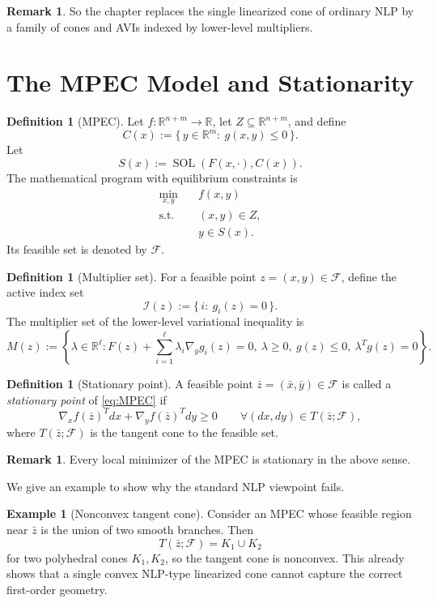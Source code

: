 \documentclass[pdflatex,sn-mathphys-num]{sn-jnl}%
\theoremstyle{definition}
\newtheorem{definition}[theorem]{Definition}
\newtheorem{remark}[theorem]{Remark}
\newtheorem{example}[theorem]{Example}
\newcommand{\R}{\mathbb{R}}
\newcommand{\Fcal}{\mathcal{F}}
\newcommand{\Ical}{\mathcal{I}}
\newcommand{\SOL}{\operatorname{SOL}}
\begin{document}
\begin{remark}
So the chapter replaces the single linearized cone of ordinary NLP by a
family of cones and AVIs indexed by lower-level multipliers.
\end{remark}

\section{The MPEC Model and Stationarity}

\begin{definition}[MPEC]
Let $f:\R^{n+m}\to\R$, let $Z\subseteq \R^{n+m}$, and define
\[
C(x):=\{\,y\in\R^m:\ g(x,y)\le 0\,\}.
\]
Let
\[
S(x):=\SOL(F(x,\cdot),C(x)).
\]
The mathematical program with equilibrium constraints is
\begin{equation}
\label{eq:MPEC}
\begin{aligned}
\min_{x,y}\quad & f(x,y)\\
\text{s.t.}\quad & (x,y)\in Z,\\
& y\in S(x).
\end{aligned}
\end{equation}
Its feasible set is denoted by $\Fcal$.
\end{definition}

\begin{definition}[Multiplier set]
For a feasible point $z=(x,y)\in \Fcal$, define the active index set
\[
\Ical(z):=\{\,i:\ g_i(z)=0\,\}.
\]
The multiplier set of the lower-level variational inequality is
\[
M(z):=
\left\{
\lambda\in\R^\ell:
F(z)+\sum_{i=1}^{\ell}\lambda_i\nabla_y g_i(z)=0,\ 
\lambda\ge 0,\ 
g(z)\le 0,\ 
\lambda^T g(z)=0
\right\}.
\]
\end{definition}

\begin{definition}[Stationary point]
A feasible point $\bar z=(\bar x,\bar y)\in\Fcal$ is called a
\emph{stationary point} of \eqref{eq:MPEC} if
\[
\nabla_x f(\bar z)^Tdx+\nabla_y f(\bar z)^Tdy\ge 0
\qquad \forall (dx,dy)\in T(\bar z;\Fcal),
\]
where $T(\bar z;\Fcal)$ is the tangent cone to the feasible set.
\end{definition}

\begin{remark}
Every local minimizer of the MPEC is stationary in the above sense.
\end{remark}

We give an example to show why the standard NLP viewpoint fails.
\begin{example}[Nonconvex tangent cone]
Consider an MPEC whose feasible region near $\bar z$ is the union of two
smooth branches. Then
\[
T(\bar z;\Fcal)=K_1\cup K_2
\]
for two polyhedral cones $K_1,K_2$, so the tangent cone is nonconvex.
This already shows that a single convex NLP-type linearized cone cannot
capture the correct first-order geometry.
\end{example}
\end{document}
